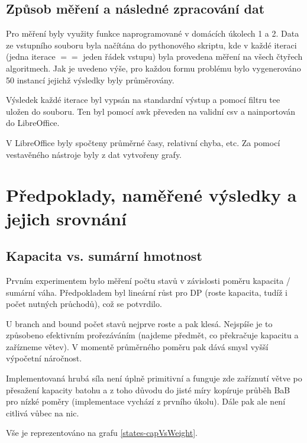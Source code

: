\documentclass[a4paper]{article}
\begin{document}
	
	\subsection{Způsob měření a následné zpracování dat}
		Pro měření byly využity funkce naprogramované v domácích úkolech 1 a 2. Data ze vstupního souboru byla načítána do pythonového skriptu, kde v každé iteraci (jedna iterace $==$ jeden řádek vstupu)	byla provedena měření na všech čtyřech algoritmech. Jak je uvedeno výše, pro každou formu problému bylo vygenerováno 50 instancí jejichž výsledky byly průměrovány.
		
		Výsledek každé iterace byl vypsán na standardní výstup a pomocí filtru tee uložen do souboru. Ten byl pomocí awk převeden na validní csv a nainportován do LibreOffice.
		
		V LibreOffice byly spočteny průměrné časy, relativní chyba, etc. Za pomocí vestavěného nástroje byly z dat vytvořeny grafy.

\section{Předpoklady, naměřené výsledky a jejich srovnání}
	\subsection{Kapacita vs. sumární hmotnost}

		Prvním experimentem bylo měření počtu stavů v závislosti poměru kapacita / sumární váha.  Předpokladem byl lineární růst pro DP (roste kapacita, tudíž i počet nutných průchodů), což se potvrdilo.
	
		U branch and bound počet stavů nejprve roste a pak klesá. Nejspíše je to způsobeno efektivním prořezáváním (najdeme předmět, co překračuje kapacitu a zařízneme větev). V momentě průměrného poměru pak dává smysl vyšší výpočetní náročnost.
	
		Implementovaná hrubá síla není úplně primitivní a funguje zde zaříznutí větve po přesažení kapacity batohu a z toho důvodu do jisté míry kopíruje průběh BaB pro nízké poměry (implementace vychází z prvního úkolu). Dále pak ale není citlivá vůbec na nic.	
		
		Vše je reprezentováno na grafu \ref{states-capVsWeight}.
	
\end{document}
